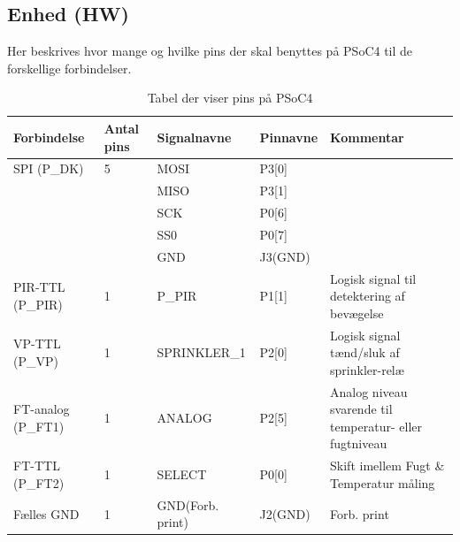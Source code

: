 \begin{table}[H]
\subsection{Enhed (HW)}
Her beskrives hvor mange og hvilke pins der skal benyttes på PSoC4 til de forskellige forbindelser.
\caption{Tabel der viser pins på PSoC4}
\begin{small}
\begin{tabular}{|p{}|p{2cm}|p{}|p{}|p{2.6cm}|}
\hline

\textbf{Forbindelse}	&\textbf{Antal pins} 	&\textbf{Signalnavne} &\textbf{Pinnavne} &\textbf{Kommentar}  \\ \hline

SPI 	(P\_DK)		&5 						&MOSI				&P3[0]		&					\\\cline{3-4}
					&					&MISO				&P3[1]		&					\\\cline{3-4}
					&					&SCK					&P0[6]		&					\\\cline{3-4}
					&					&SS0					&P0[7]		&					\\\cline{3-4}
					&					&GND					&J3(GND) 	&					\\\hline
	
PIR-TTL	(P\_PIR)	&1 						&P\_PIR				&P1[1] 		&Logisk signal til detektering af bevægelse					\\\hline

VP-TTL (P\_VP)	&1 						&SPRINKLER\_1		&P2[0]		&Logisk signal tænd/sluk af sprinkler-relæ					\\\hline

																								
		
FT-analog (P\_FT1)	&1					&ANALOG				&P2[5]		&Analog niveau svarende til temperatur- eller fugtniveau \\\hline
FT-TTL (P\_FT2)	&1						&SELECT				&P0[0]		&Skift imellem Fugt \& Temperatur måling \\\hline
																											
					
Fælles GND			&1 					&GND(Forb. print)	&J2(GND) 	&Forb. print			\\\hline					
					


\end{tabular}
\end{small}
\label{table:enhed_forbindelse}
\end{table}

